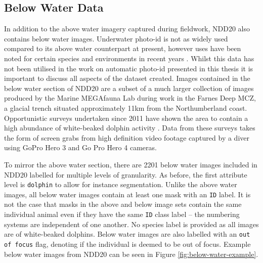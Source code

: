 \subsection{Below Water Data}\label{ch:datasetCreation,sec:NDD20,sub:belowWaterData}

In addition to the above water imagery captured during fieldwork, NDD20 also contains below water images. Underwater photo-id is not as widely used compared to its above water counterpart at present, however uses have been noted for certain species and environments in recent years \cite{van_bressem_visual_2018, veronique_underwater_2022}. Whilst this data has not been utilised in the work on automatic photo-id presented in this thesis it is important to discuss all aspects of the dataset created. Images contained in the below water section of NDD20 are a subset of a much larger collection of images produced by the Marine MEGAfauna Lab during work in the Farnes Deep MCZ, a glacial trench situated approximately 11km from the Northumberland coast. Opportunistic surveys undertaken since 2011 have shown the area to contain a high abundance of white-beaked dolphin activity \cite{van_bressem_visual_2018}. Data from these surveys takes the form of screen grabs from high definition video footage captured by a diver using GoPro Hero 3 and Go Pro Hero 4 cameras. 

To mirror the above water section, there are 2201 below water images included in NDD20 labelled for multiple levels of granularity. As before, the first attribute level is \texttt{dolphin} to allow for instance segmentation. Unlike the above water images, all below water images contain at least one mask with an \texttt{ID} label. It is not the case that masks in the above and below image sets contain the same individual animal even if they have the same \texttt{ID} class label -- the numbering systems are independent of one another. No species label is provided as all images are of white-beaked dolphins. Below water images are also labelled with an \texttt{out of focus} flag, denoting if the individual is deemed to be out of focus. Example below water images from NDD20 can be seen in Figure \ref{fig:below-water-example}.

